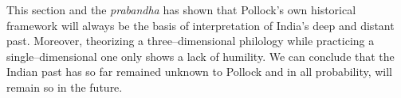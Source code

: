 This section and the \textit{prabandha} has shown that Pollock’s own historical framework will always be the basis of interpretation of India’s deep and distant past. Moreover, theorizing a three–dimensional philology while practicing a single–dimensional one only shows a lack of humility. We can conclude that the Indian past has so far remained unknown to Pollock and in all probability, will remain so in the future.


